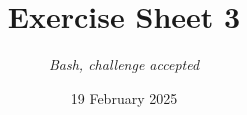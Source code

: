 




\title{{\vspace{-12mm}\huge\textbf{Exercise Sheet 3}}}
\author{\textit{Bash, challenge accepted}}
\date{{\small 19 February 2025}}


    \maketitle
    \bigskip
    
    \bigskip
    
    \bigskip
    
    \bigskip
    
    \bigskip
    
    \bigskip
    
